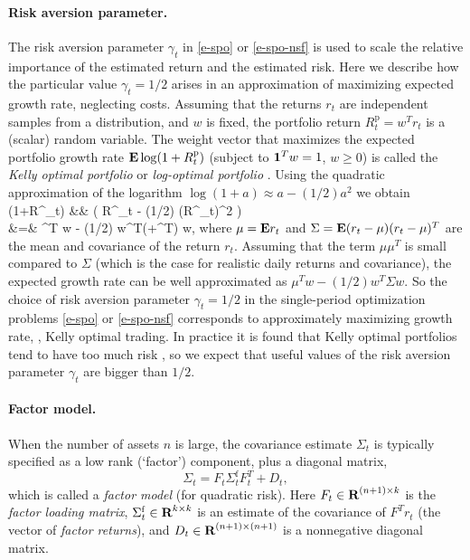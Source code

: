\documentclass[openany]{now}
\newcommand{\Rp}{R^\mathrm{p}}
\begin{document}
\paragraph{Risk aversion parameter.}
The risk aversion parameter $\gamma_t$ in \eqref{e-spo} or \eqref{e-spo-nsf}
is used to scale the relative importance of the estimated return and the estimated
risk.  Here we describe how the particular value $\gamma_t=1/2$
arises in an approximation of maximizing expected growth rate, neglecting
costs.
Assuming that the returns $r_t$ are independent samples from a distribution,
and $w$ is fixed, the portfolio return $\Rp_t =w^Tr_t$ is a (scalar) random variable.
The weight vector that maximizes the expected portfolio growth rate
$\Expect \log (1+ \Rp_t)$ (subject to $\mathbf 1^Tw=1$, $w \geq 0$) is called
the \emph{Kelly optimal portfolio} or \emph{log-optimal portfolio} \cite{kelly1956new,busseti2016risk}.
Using the quadratic approximation of the logarithm
$\log(1+a) \approx a- (1/2)a^2$ we obtain
\BEAS
\Expect \log (1+\Rp_t) &\approx& \Expect \left( \Rp_t - (1/2) (\Rp_t)^2 \right)\\
&=& \mu^T w - (1/2) w^T(\Sigma+\mu\mu^T) w,
\EEAS
where $\mu=\mathbf{E} r_t$ and $\Sigma=\mathbf{E}(r_t-\mu)(r_t-\mu)^T$
are the mean and covariance of the return $r_t$.
Assuming that the term $\mu \mu^T$ is small compared to $\Sigma$
(which is the case for realistic daily returns and covariance),
the expected growth rate can be well approximated as
$\mu^T w -(1/2) w^T \Sigma w$.
So the choice of risk aversion parameter $\gamma_t = 1/2$
in the single-period optimization problems
\eqref{e-spo} or \eqref{e-spo-nsf}
corresponds to approximately maximizing growth rate, \ie,
Kelly optimal trading.   In practice it is found that
Kelly optimal portfolios tend to have too much risk \cite{busseti2016risk},
so we expect that useful values of
the risk aversion parameter $\gamma_t$ are bigger than $1/2$.

\paragraph{Factor model.}
When the number of assets $n$ is large,
the covariance estimate $\Sigma_t$ is typically specified
as a low rank (`factor') component, plus a diagonal matrix,
\[
\Sigma_t = F_t \Sigma_t^\mathrm{f} F_t^T + D_t,
\]
which is called a \emph{factor model} (for quadratic risk).
Here $F_t \in {\mbox{\bf R}}^{(n+1)\times k}$ is the \emph{factor loading matrix},
$\Sigma_t^\mathrm{f} \in {\mbox{\bf R}}^{k \times k}$ is an estimate of the covariance of $F^Tr_t$
(the vector of \emph{factor returns}),
and $D_t \in {\mbox{\bf R}}^{(n+1)\times (n+1)}$ is a nonnegative diagonal matrix.
\end{document}
